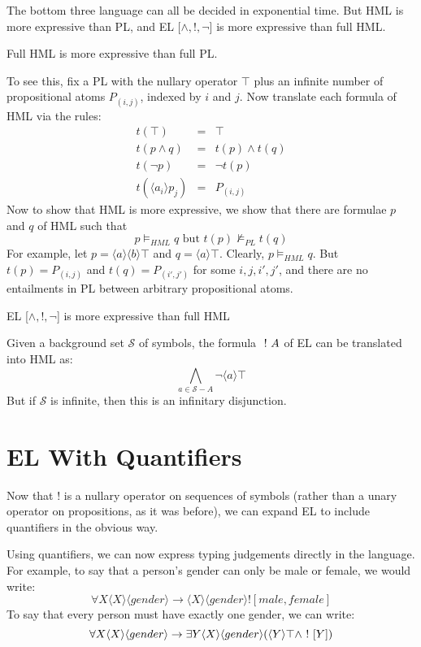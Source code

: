 The bottom three language can all be decided in exponential time.
But HML is more expressive than PL, and EL [$\land, !, \neg$]  is more expressive than full HML. 
\begin{proposition}
Full HML  is more expressive than full PL.
\end{proposition}
To see this, fix a PL with the nullary operator $\top$ plus an infinite number of propositional atoms $P_{(i,j)}$, indexed by $i$ and $j$.
Now translate each formula of HML via the rules:
\begin{eqnarray}
t(\top)  & = & \top \nonumber \\
t(p \land q) & = & t(p) \land t(q) \nonumber \\
t(\neg p) & = & \neg t(p)  \nonumber \\
t(\langle a_i \rangle p_j) & = & P_{(i,j)} \nonumber
\end{eqnarray}
Now to show that HML is more expressive, we show that there are formulae $p$ and $q$ of HML such that
\[
p \models_{HML} q \mbox{ but } t(p) \nvDash_{PL} t(q)
\]
For example, let $p = \langle a \rangle \langle b \rangle \top$ and $q = \langle a \rangle \top$.
Clearly, $p \models_{HML} q$. But $t(p) = P_{(i,j)}$ and $t(q) = P_{(i',j')}$ for some $i,j,i',j'$, and there are no entailments in PL between arbitrary propositional atoms.

\begin{proposition}
EL [$\land, !, \neg$]  is more expressive than full HML
\end{proposition}
Given a background set $\mathcal{S}$ of symbols, the formula $\ ! \  A$ of EL can be translated into HML as:
\[
\bigwedge_{a \in \mathcal{S} - A} \neg \langle a \rangle \top
\]
But if $\mathcal{S}$ is infinite, then this is an infinitary disjunction.

\section{EL With Quantifiers}
Now that $!$ is a nullary operator on sequences of symbols (rather than a unary operator on propositions, as it was before), we can expand EL to include quantifiers in the obvious way.

Using quantifiers, we can now express typing judgements directly in the language. For example, to say that a person's gender can only be male or female, we would write:
\[
\forall X \langle X \rangle \langle gender \rangle \rightarrow \langle X \rangle \langle gender \rangle ![male, female]
\]
To say that every person must have exactly one gender, we can write:
\[
\forall X  \langle X \rangle \langle gender \rangle \rightarrow \exists Y \langle X \rangle \langle gender \rangle (\langle Y \rangle \top \land \ ! \  [Y])
\]


